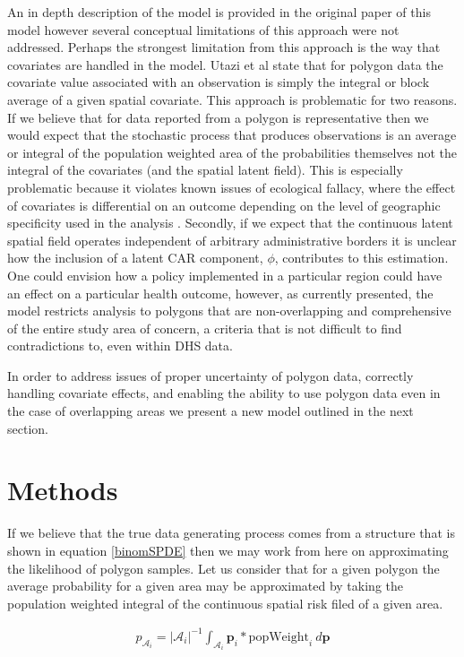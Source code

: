 \documentclass{article}
\begin{document}
An in depth description of the model is provided in the original paper of this model however several conceptual limitations of this approach were not addressed. Perhaps the strongest limitation from this approach is the way that covariates are handled in the model. Utazi et al state that for polygon data the covariate value associated with an observation is simply the integral or block average of a given spatial covariate. This approach is problematic for two reasons. If we believe that for data reported from a polygon is representative then we would expect that the stochastic process that produces observations is an average or integral of the population weighted area of the probabilities themselves not the integral of the covariates (and the spatial latent field). This is especially problematic because it violates known issues of ecological fallacy, where the effect of covariates is differential on an outcome depending on the level of geographic specificity used in the analysis \cite{Dark2007, Openshaw1984}. Secondly, if we expect that the continuous latent spatial field operates independent of arbitrary administrative borders it is unclear how the inclusion of a latent CAR component, $\phi$, contributes to this estimation. One could envision how a policy implemented in a particular region could have an effect on a particular health outcome, however, as currently presented, the model restricts analysis to polygons that are non-overlapping and comprehensive of the entire study area of concern, a criteria that is not difficult to find contradictions to, even within DHS data. 

In order to address issues of proper uncertainty of polygon data, correctly handling covariate effects, and enabling the ability to use polygon data even in the case of overlapping areas we present a new model outlined in the next section.

\section{Methods}\label{methods}

If we believe that the true data generating process comes from a structure that is shown in equation \ref{binomSPDE} then we may work from here on approximating the likelihood of polygon samples. Let us consider that for a given polygon the average probability for a given area may be approximated by taking the population weighted integral of the continuous spatial risk filed of a given area. 

\begin{align}\label{pIntegral}
p_{\mathcal{A}_i} = |\mathcal{A}_i|^{-1}\int_{\mathcal{A}_i} \boldsymbol{p}_i * \text{popWeight}_i ~ d\boldsymbol{p}
\end{align}
\end{document}
